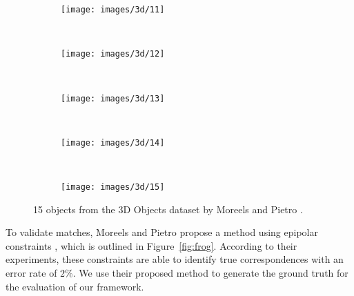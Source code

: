 \documentclass[10pt,journal,cspaper,compsoc]{IEEEtran}
\begin{document}
\begin{figure}[htb]
    \begin{subfigure}[t]{0.19\columnwidth}
        \centering
        \texttt{[image: images/3d/11]}
    \end{subfigure}%
    ~ %
    \begin{subfigure}[t]{0.19\columnwidth}
        \centering
        \texttt{[image: images/3d/12]}
    \end{subfigure}%
    ~ %
    \begin{subfigure}[t]{0.19\columnwidth}
        \centering
        \texttt{[image: images/3d/13]}
    \end{subfigure}%
    ~ %
    \begin{subfigure}[t]{0.19\columnwidth}
        \centering
        \texttt{[image: images/3d/14]}
    \end{subfigure}%
    ~ %
    \begin{subfigure}[t]{0.19\columnwidth}
        \centering
        \texttt{[image: images/3d/15]}
    \end{subfigure}%
    \vspace{1.5 mm}

    \caption{15 objects from the 3D Objects dataset by Moreels
    and Pietro \cite{moreels2007evaluation}.}
    \label{fig:3d_objects}
\end{figure}


To validate matches, Moreels and Pietro propose a method 
using epipolar constraints \cite[p.266]{moreels2007evaluation}, which is 
outlined in Figure~\ref{fig:frog}.  According to their 
experiments, these constraints are able to identify 
true correspondences with an error rate of $2\%$. We use their proposed 
method to generate the ground truth for the evaluation of our framework.
\end{document}

